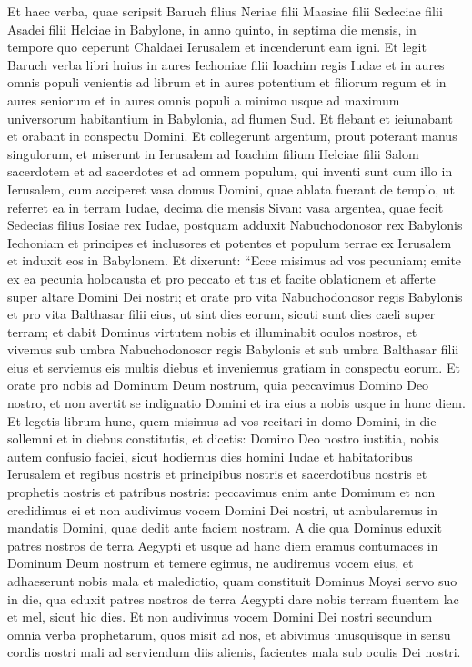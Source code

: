 \begin{biblechapter}
 \verse Et haec verba, quae scripsit Baruch filius Neriae filii Maasiae filii Sedeciae filii Asadei filii Helciae in Babylone, 
\verse in anno quinto, in septima die mensis, in tempore quo ceperunt Chaldaei Ierusalem et incenderunt eam igni. 
\verse Et legit Baruch verba libri huius in aures Iechoniae filii Ioachim regis Iudae et in aures omnis populi venientis ad librum 
\verse et in aures potentium et filiorum regum et in aures seniorum et in aures omnis populi a minimo usque ad maximum universorum habitantium in Babylonia, ad flumen Sud. 
\verse Et flebant et ieiunabant et orabant in conspectu Domini. 
\verse Et collegerunt argentum, prout poterant manus singulorum, 
\verse et miserunt in Ierusalem ad Ioachim filium Helciae filii Salom sacerdotem et ad sacerdotes et ad omnem populum, qui inventi sunt cum illo in Ierusalem, 
\verse cum acciperet vasa domus Domini, quae ablata fuerant de templo, ut referret ea in terram Iudae, decima die mensis Sivan: vasa argentea, quae fecit Sedecias filius Iosiae rex Iudae, 
\verse postquam adduxit Nabuchodonosor rex Babylonis Iechoniam et principes et inclusores et potentes et populum terrae ex Ierusalem et induxit eos in Babylonem. 
\verse Et dixerunt: “Ecce misimus ad vos pecuniam; emite ex ea pecunia holocausta et pro peccato et tus et facite oblationem et afferte super altare Domini Dei nostri; 
\verse et orate pro vita Nabuchodonosor regis Babylonis et pro vita Balthasar filii eius, ut sint dies eorum, sicuti sunt dies caeli super terram; 
\verse et dabit Dominus virtutem nobis et illuminabit oculos nostros, et vivemus sub umbra Nabuchodonosor regis Babylonis et sub umbra Balthasar filii eius et serviemus eis multis diebus et inveniemus gratiam in conspectu eorum. 
\verse Et orate pro nobis ad Dominum Deum nostrum, quia peccavimus Domino Deo nostro, et non avertit se indignatio Domini et ira eius a nobis usque in hunc diem. 
\verse Et legetis librum hunc, quem misimus ad vos recitari in domo Domini, in die sollemni et in diebus constitutis, 
\verse et dicetis:
 Domino Deo nostro iustitia, nobis autem confusio faciei, sicut hodiernus dies homini Iudae et habitatoribus Ierusalem 
\verse et regibus nostris et principibus nostris et sacerdotibus nostris et prophetis nostris et patribus nostris: 
\verse peccavimus enim ante Dominum et non credidimus ei 
\verse et non audivimus vocem Domini Dei nostri, ut ambularemus in mandatis Domini, quae dedit ante faciem nostram. 
\verse A die qua Dominus eduxit patres nostros de terra Aegypti et usque ad hanc diem eramus contumaces in Dominum Deum nostrum et temere egimus, ne audiremus vocem eius, 
\verse et adhaeserunt nobis mala et maledictio, quam constituit Dominus Moysi servo suo in die, qua eduxit patres nostros de terra Aegypti dare nobis terram fluentem lac et mel, sicut hic dies. 
\verse Et non audivimus vocem Domini Dei nostri secundum omnia verba prophetarum, quos misit ad nos, 
\verse et abivimus unusquisque in sensu cordis nostri mali ad serviendum diis alienis, facientes mala sub oculis Dei nostri.
 

\end{biblechapter}
